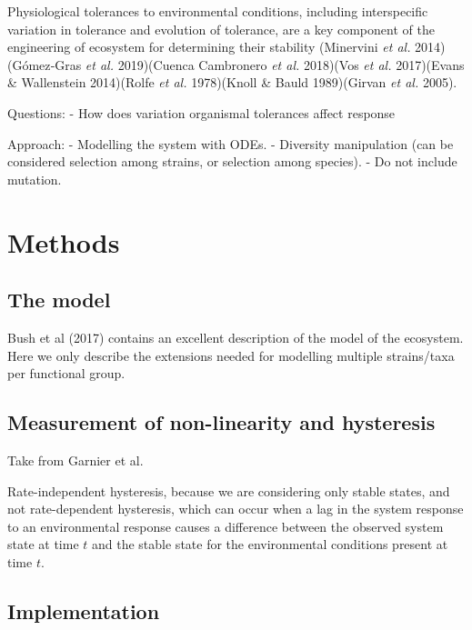 \documentclass{article}
\begin{document}
Physiological tolerances to environmental conditions, including
interspecific variation in tolerance and evolution of tolerance, are a
key component of the engineering of ecosystem for determining their
stability (Minervini \emph{et al.} 2014)(Gómez‐Gras \emph{et al.}
2019)(Cuenca Cambronero \emph{et al.} 2018)(Vos \emph{et al.}
2017)(Evans \& Wallenstein 2014)(Rolfe \emph{et al.} 1978)(Knoll \&
Bauld 1989)(Girvan \emph{et al.} 2005).

Questions: - How does variation organismal tolerances affect response

Approach: - Modelling the system with ODEs. - Diversity manipulation
(can be considered selection among strains, or selection among species).
- Do not include mutation.

\hypertarget{methods}{%
\section{Methods}\label{methods}}

\hypertarget{the-model}{%
\subsection{The model}\label{the-model}}

Bush et al (2017) contains an excellent description of the model of the
ecosystem. Here we only describe the extensions needed for modelling
multiple strains/taxa per functional group.

\hypertarget{measurement-of-non-linearity-and-hysteresis}{%
\subsection{Measurement of non-linearity and
hysteresis}\label{measurement-of-non-linearity-and-hysteresis}}

Take from Garnier et al.

Rate-independent hysteresis, because we are considering only stable
states, and not rate-dependent hysteresis, which can occur when a lag in
the system response to an environmental response causes a difference
between the observed system state at time \(t\) and the stable state for
the environmental conditions present at time \(t\).

\hypertarget{implementation}{%
\subsection{Implementation}\label{implementation}}
\end{document}
